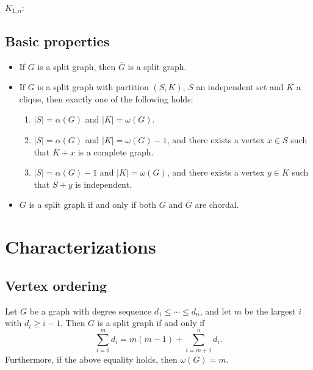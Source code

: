 \documentclass[11pt]{article}
\begin{document}
$K_{1,n}$:
\newline
\newline
{}


\subsection{Basic properties}
\begin{itemize}
	\item If $G$ is a split graph, then $\overline{G}$ is a split graph.
	\item If $G$ is a split graph with partition $(S,K)$, $S$ an independent set and $K$
		a clique, then exactly one of the following holds:
		\begin{enumerate}
			\item $|S|=\alpha(G)$ and $|K|=\omega(G)$.
			\item $|S|=\alpha(G)$ and $|K|=\omega(G)-1$, and there exists a vertex
				$x\in S$ such that $K+x$ is a complete graph.
			\item $|S|=\alpha(G)-1$ and $|K|=\omega(G)$, and there exists a vertex
				$y\in K$ such that $S+y$ is independent.
		\end{enumerate}
	\item $G$ is a split graph if and only if both $G$ and $\overline{G}$ are chordal.\cite{Golumbic}
\end{itemize}


\section{Characterizations}
\subsection{Vertex ordering}
Let $G$ be a graph with degree sequence $d_1\le\cdots\le d_n$, and let $m$ be
the largest $i$ with $d_i\ge i-1$. Then $G$ is a split graph if and only if
\[\sum_{i=1}^md_i=m(m-1)+\sum_{i=m+1}^nd_i.\]
Furthermore, if the above equality holds, then $\omega(G)=m$.\cite{Hammer}
\end{document}
